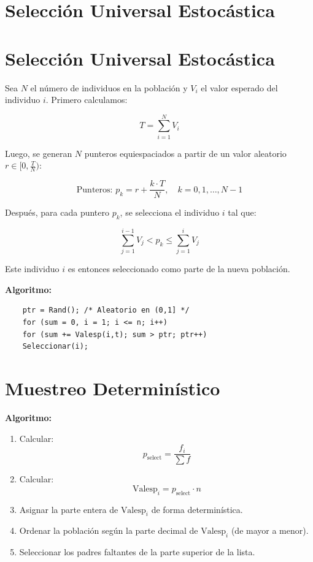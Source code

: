 \documentclass[11pt, letterpaper]{article}
\begin{document}
\section*{Selección Universal Estocástica}

\section*{Selección Universal Estocástica}

Sea \( N \) el número de individuos en la población y \( V_i \) el valor esperado del individuo \( i \). Primero calculamos:

\[
T = \sum_{i=1}^N V_i
\]

Luego, se generan \( N \) punteros equiespaciados a partir de un valor aleatorio \( r \in [0, \frac{T}{N}) \):

\[
\text{Punteros: } p_k = r + \dfrac{k \cdot T}{N}, \quad k = 0, 1, \ldots, N-1
\]

Después, para cada puntero \( p_k \), se selecciona el individuo \( i \) tal que:

\[
\sum_{j=1}^{i-1} V_j < p_k \leq \sum_{j=1}^{i} V_j
\]

Este individuo \( i \) es entonces seleccionado como parte de la nueva población.



\textbf{Algoritmo:}
\begin{verbatim}
	ptr = Rand(); /* Aleatorio en (0,1] */
	for (sum = 0, i = 1; i <= n; i++)
	for (sum += Valesp(i,t); sum > ptr; ptr++)
	Seleccionar(i);
\end{verbatim}

\section*{Muestreo Determinístico}

\textbf{Algoritmo:}
\begin{enumerate}
	\item Calcular:
	\[
	p_{\text{select}} = \dfrac{f_i}{\sum f}
	\]
	\item Calcular:
	\[
	\text{Valesp}_i = p_{\text{select}} \cdot n
	\]
	\item Asignar la parte entera de \( \text{Valesp}_i \) de forma determinística.
	\item Ordenar la población según la parte decimal de \( \text{Valesp}_i \) (de mayor a menor).
	\item Seleccionar los padres faltantes de la parte superior de la lista.
\end{enumerate}
\end{document}
